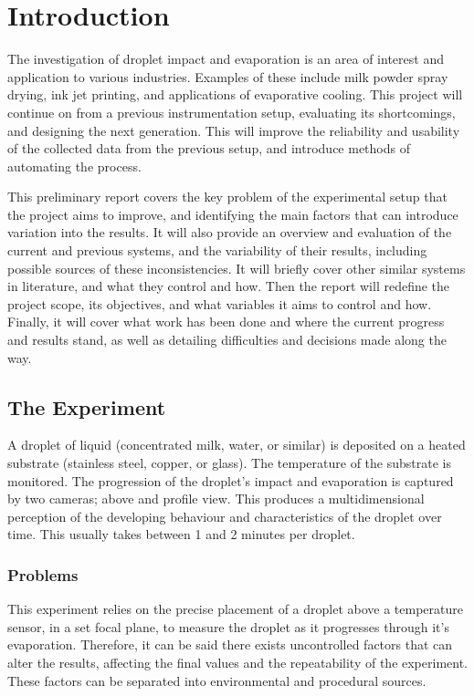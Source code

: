 \chapter{Introduction}\label{C:intro}
The investigation of droplet impact and evaporation is an area of interest and application to various industries. Examples of these include milk powder spray drying, ink jet printing, and applications of evaporative cooling. This project will continue on from a previous instrumentation setup, evaluating its shortcomings, and designing the next generation. This will improve the reliability and usability of the collected data from the previous setup, and introduce methods of automating the process. 

This preliminary report covers the key problem of the experimental setup that the project aims to improve, and identifying the main factors that can introduce variation into the results. It will also provide an overview and evaluation of the current and previous systems, and the variability of their results, including possible sources of these inconsistencies. It will briefly cover other similar systems in literature, and what they control and how. Then the report will redefine the project scope, its objectives, and what variables it aims to control and how. Finally, it will cover what work has been done and where the current progress and results stand, as well as detailing difficulties and decisions made along the way.  

\section*{The Experiment}

A droplet of liquid (concentrated milk, water, or similar) is deposited on a heated substrate (stainless steel, copper, or glass). The temperature of the substrate is monitored. The progression of the droplet's impact and evaporation is captured by two cameras; above and profile view. This produces a multidimensional perception of the developing behaviour and characteristics of the droplet over time. This usually takes between 1 and 2 minutes per droplet.

\subsection*{Problems}

This experiment relies on the precise placement of a droplet above a temperature sensor, in a set focal plane, to measure the droplet as it progresses through it's evaporation.
Therefore, it can be said there exists uncontrolled factors that can alter the results, affecting the final values and the repeatability of the experiment.
These factors can be separated into environmental and procedural sources.

